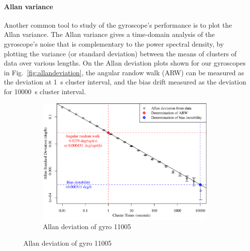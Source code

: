 \paragraph{Allan variance}


Another common tool to study of the gyroscope's performance is to plot the Allan variance. The Allan variance gives a time-domain analysis of the gyroscope's noise that is complementary to the power spectral density, by plotting the variance (or standard deviation) between the means of clusters of data over various lengths. On the Allan deviation plots shown for our gyroscopes in Fig.~\ref{fig:allandeviation}, the angular randow walk (ARW) can be measured as the deviation at \SI{1}{\second} cluster interval, and the bias drift measured as the deviation for \SI{10000}{\second} cluster interval. 
\begin{figure}[!h]

	\begin{subfigure}[b]{\textwidth}
		\centering
		\includegraphics[width=0.98\textwidth]{Figures/allandev_11005.pdf} 
		\caption{Allan deviation of gyro 11005}
		\label{subfig:allan11005}
	\end{subfigure}
	

\end{figure}
